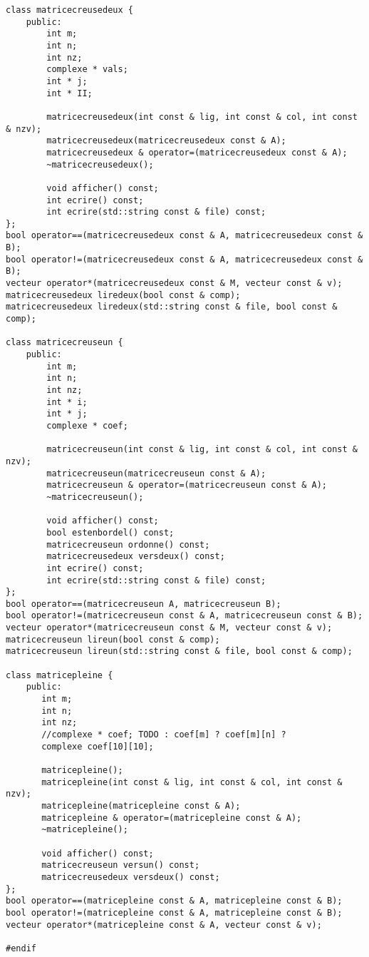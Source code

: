 \documentclass[a4paper]{article}
\begin{document}
\begin{verbatim}
class matricecreusedeux {
    public:
        int m;
        int n;
        int nz;
        complexe * vals;
        int * j;
        int * II;

        matricecreusedeux(int const & lig, int const & col, int const & nzv);
        matricecreusedeux(matricecreusedeux const & A);
        matricecreusedeux & operator=(matricecreusedeux const & A);
        ~matricecreusedeux();

        void afficher() const;
        int ecrire() const;
        int ecrire(std::string const & file) const;
};
bool operator==(matricecreusedeux const & A, matricecreusedeux const & B);
bool operator!=(matricecreusedeux const & A, matricecreusedeux const & B);
vecteur operator*(matricecreusedeux const & M, vecteur const & v);
matricecreusedeux liredeux(bool const & comp);
matricecreusedeux liredeux(std::string const & file, bool const & comp);

class matricecreuseun {
    public:
        int m;
        int n;
        int nz;
        int * i;
        int * j;
        complexe * coef;

        matricecreuseun(int const & lig, int const & col, int const & nzv);
        matricecreuseun(matricecreuseun const & A);
        matricecreuseun & operator=(matricecreuseun const & A);
        ~matricecreuseun();

        void afficher() const;
        bool estenbordel() const;
        matricecreuseun ordonne() const;
        matricecreusedeux versdeux() const;
        int ecrire() const;
        int ecrire(std::string const & file) const;
};
bool operator==(matricecreuseun A, matricecreuseun B);
bool operator!=(matricecreuseun const & A, matricecreuseun const & B);
vecteur operator*(matricecreuseun const & M, vecteur const & v);
matricecreuseun lireun(bool const & comp);
matricecreuseun lireun(std::string const & file, bool const & comp);

class matricepleine {
    public:
       int m;
       int n;
       int nz;
       //complexe * coef; TODO : coef[m] ? coef[m][n] ?
       complexe coef[10][10];

       matricepleine();
       matricepleine(int const & lig, int const & col, int const & nzv);
       matricepleine(matricepleine const & A);
       matricepleine & operator=(matricepleine const & A);
       ~matricepleine();

       void afficher() const;
       matricecreuseun versun() const;
       matricecreusedeux versdeux() const;
};
bool operator==(matricepleine const & A, matricepleine const & B);
bool operator!=(matricepleine const & A, matricepleine const & B);
vecteur operator*(matricepleine const & A, vecteur const & v);

#endif
\end{verbatim}
\end{document}
